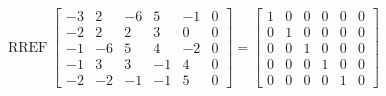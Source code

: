 \begin{exerciseAnswer} 


\[\operatorname{RREF} \left[\begin{array}{ccccc|c}
-3 & 2 & -6 & 5 & -1 & 0 \\
-2 & 2 & 2 & 3 & 0 & 0 \\
-1 & -6 & 5 & 4 & -2 & 0 \\
-1 & 3 & 3 & -1 & 4 & 0 \\
-2 & -2 & -1 & -1 & 5 & 0
\end{array}\right] = \left[\begin{array}{ccccc|c}
1 & 0 & 0 & 0 & 0 & 0 \\
0 & 1 & 0 & 0 & 0 & 0 \\
0 & 0 & 1 & 0 & 0 & 0 \\
0 & 0 & 0 & 1 & 0 & 0 \\
0 & 0 & 0 & 0 & 1 & 0
\end{array}\right] \]



\end{exerciseAnswer}
